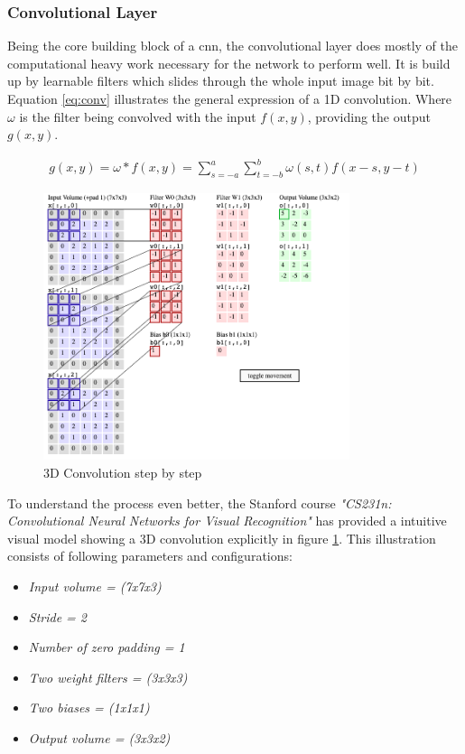\documentclass[USenglish]{ifimaster}  %
\begin{document}
\subsubsection{Convolutional Layer}
Being the core building block of a \ac{cnn}, the convolutional layer does mostly of the computational heavy work necessary for the network to perform well. 
It is build up by learnable filters which slides through the whole input image bit by bit. Equation \ref{eq:conv} illustrates the general expression of a 1D convolution. Where $\omega$ is the filter being convolved with the input $f(x,y)$, providing the output $g(x,y)$. 

\begin{equation}\label{eq:conv}
\begin{aligned}
g(x,y) = \omega * f(x,y) = \sum_{s=-a}^{a}\sum_{t=-b}^{b}\omega(s,t)f(x-s,y-t)
\end{aligned}
\end{equation}

\begin{figure}[ht]
    \centering
    \includegraphics[width=0.8\textwidth]{bilder/conv2.png}
    \caption{3D Convolution step by step \cite{website:cs231n}}
    \label{fig:conv}
\end{figure}

To understand the process even better, the Stanford course \textit{"CS231n:  Convolutional  Neural  Networks  for  Visual Recognition"} has provided a intuitive visual model showing a 3D convolution explicitly in figure \ref{fig:conv}. This illustration consists of following parameters and configurations:

\begin{itemize}
    \item \textit{Input volume = (7x7x3)}
    \item \textit{Stride = 2}
    \item \textit{Number of zero padding = 1}
    \item \textit{Two weight filters = (3x3x3)}
    \item \textit{Two biases = (1x1x1)}
    \item \textit{Output volume = (3x3x2)}
\end{itemize}
\end{document}
